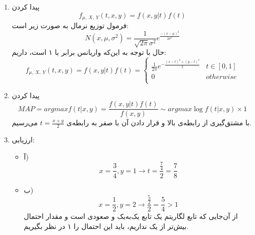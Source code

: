 
\begin{enumerate}
	\item پیدا کردن 
	$$f_{\mu, \: X, \: Y}(t, x, y) = f(x, y | t) f(t)$$
	فرمول توزیع نرمال به صورت زیر است:
	$$N(x, \mu, \sigma^2) = \frac{1}{\sqrt{2\pi} \sigma^2} e^{\frac{-(x - \mu) ^2}{2\sigma^2}}$$
	حال با توجه به این‌که واریانس برابر با ۱ است، داریم:
	$$f_{\mu, \: X, \: Y}(t, x, y) = f(x, y | t) f(t) = \begin{cases}
	\frac{1}{2\pi} e^{-\frac{(x - t)^2 + (y - t)^2}{2}} & t \in [0, 1] \\
	0 & otherwise \\
	\end{cases}$$
	\item 
	پیدا کردن 
	$$MAP = arg max f(t|x, y) = \frac{f(x, y | t) f(t)}{f(x, y)} \sim arg max \log{f(t | x, y) \times 1}$$ 
	با مشتق‌گیری از رابطه‌ی بالا و قرار دادن آن با صفر به رابطه‌ی $t = \frac{x + y}{2}$ می‌رسیم.
	\item 
	ارزیابی:
	\begin{itemize}
		\item آ)
	$$x = \frac{3}{4}, y = 1 \rightarrow t = \frac{\frac{7}{4}}{2} = \frac{7}{8}$$
		\item ب)
		$$x = \frac{1}{2}, y = 2 \rightarrow \frac{\frac{5}{2}}{2} = \frac{5}{4} > 1$$
		از آن‌جایی که تابع لگاریتم یک تابع یک‌به‌یک و صعودی است و مقدار احتمال بیش‌تر از یک نداریم، باید این احتمال را ۱ در نظر بگیریم.
	\end{itemize}
\end{enumerate}